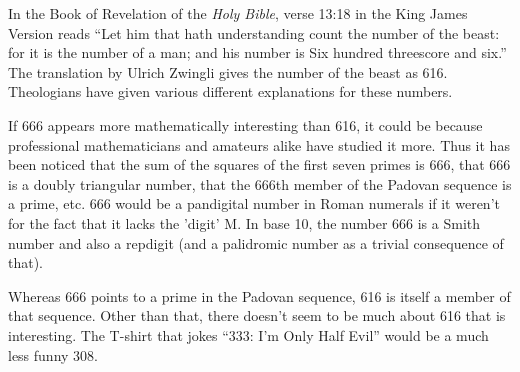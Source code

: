 \documentclass[12pt]{article}
\begin{document}
In the Book of Revelation of the {\it Holy Bible}, verse 13:18 in the King James Version reads ``Let him that hath understanding count the number of the beast: for it is the number of a man; and his number is Six hundred threescore and six.'' The translation by Ulrich Zwingli gives the number of the beast as 616. Theologians have given various different explanations for these numbers.

If 666 appears more mathematically interesting than 616, it could be because professional mathematicians and amateurs alike have studied it more. Thus it has been noticed that the sum of the squares of the first seven primes is 666, that 666 is a doubly triangular number, that the 666th member of the Padovan sequence is a prime, etc. 666 would be a pandigital number in Roman numerals if it weren't for the fact that it lacks the 'digit' M. In base 10, the number 666 is a Smith number and also a repdigit (and a palidromic number as a trivial consequence of that).

Whereas 666 points to a prime in the Padovan sequence, 616 is itself a member of that sequence. Other than that, there doesn't seem to be much about 616 that is interesting. The T-shirt that jokes ``333: I'm Only Half Evil'' would be a much less funny 308.
\end{document}
